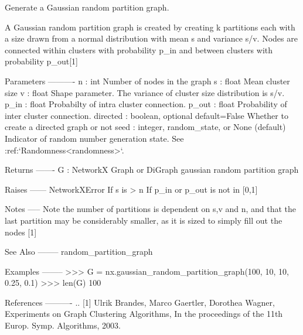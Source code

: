 \begin{DoxyVerb}Generate a Gaussian random partition graph.

A Gaussian random partition graph is created by creating k partitions
each with a size drawn from a normal distribution with mean s and variance
s/v. Nodes are connected within clusters with probability p_in and
between clusters with probability p_out[1]

Parameters
----------
n : int
  Number of nodes in the graph
s : float
  Mean cluster size
v : float
  Shape parameter. The variance of cluster size distribution is s/v.
p_in : float
  Probabilty of intra cluster connection.
p_out : float
  Probability of inter cluster connection.
directed : boolean, optional default=False
  Whether to create a directed graph or not
seed : integer, random_state, or None (default)
    Indicator of random number generation state.
    See :ref:`Randomness<randomness>`.

Returns
-------
G : NetworkX Graph or DiGraph
  gaussian random partition graph

Raises
------
NetworkXError
  If s is > n
  If p_in or p_out is not in [0,1]

Notes
-----
Note the number of partitions is dependent on s,v and n, and that the
last partition may be considerably smaller, as it is sized to simply
fill out the nodes [1]

See Also
--------
random_partition_graph

Examples
--------
>>> G = nx.gaussian_random_partition_graph(100, 10, 10, 0.25, 0.1)
>>> len(G)
100

References
----------
.. [1] Ulrik Brandes, Marco Gaertler, Dorothea Wagner,
   Experiments on Graph Clustering Algorithms,
   In the proceedings of the 11th Europ. Symp. Algorithms, 2003.
\end{DoxyVerb}
 \mbox{\label{namespacenetworkx_1_1generators_1_1community_a32cd806ad1089ad3b643e09338fe2ba0}} 
